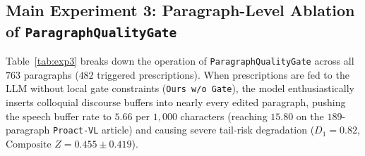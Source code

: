 \documentclass[11pt]{article}
\newcommand{\gate}{\texttt{ParagraphQualityGate}}
\begin{document}
\subsection{Main Experiment 3: Paragraph-Level Ablation of \gate{}}
\label{sec:exp_ablation}

\begin{table}[t]
\centering
\small
{}
\caption{\textbf{Main Experiment 3 (Table 3): Per-Article Audit of Prescription Repair \& \gate{}.} Across $763$ paragraphs, $482$ triggered prescriptions: $294$ passed on the first attempt, $188$ failed local gate checks and triggered constrained re-repair ($166$ fixed, $22$ safely rolled back), guaranteeing $100.0\%$ factual retention.}
\label{tab:exp3}
\end{table}

Table~\ref{tab:exp3} breaks down the operation of \gate{} across all $763$ paragraphs ($482$ triggered prescriptions). When prescriptions are fed to the LLM without local gate constraints (\texttt{Ours w/o Gate}), the model enthusiastically inserts colloquial discourse buffers into nearly every edited paragraph, pushing the speech buffer rate to $5.66$ per $1,000$ characters (reaching $15.80$ on the $189$-paragraph \texttt{Proact-VL} article) and causing severe tail-risk degradation ($D_1 = 0.82$, $\text{Composite } Z = 0.455 \pm 0.419$).
\end{document}
